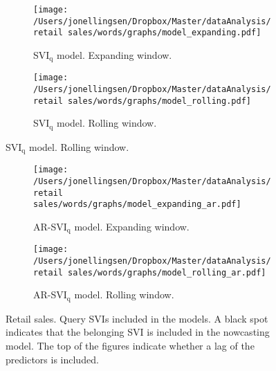\begin{figure}[ht]
    \centering
    \begin{subfigure}[b]{\textwidth}
\caption{SVI$_{\text{q}}$ model. Expanding window.}
        \texttt{[image: /Users/jonellingsen/Dropbox/Master/dataAnalysis/retail sales/words/graphs/model\_expanding.pdf]}
    \end{subfigure}
    \begin{subfigure}[b]{\textwidth}
\caption{SVI$_{\text{q}}$ model. Rolling window.}
        \texttt{[image: /Users/jonellingsen/Dropbox/Master/dataAnalysis/retail sales/words/graphs/model\_rolling.pdf]}
    \end{subfigure}
\end{figure}
\begin{figure}\ContinuedFloat
\begin{subfigure}[b]{\textwidth}
 \caption{AR-SVI$_{\text{q}}$ model. Expanding window.}        
\texttt{[image: /Users/jonellingsen/Dropbox/Master/dataAnalysis/retail sales/words/graphs/model\_expanding\_ar.pdf]}
    \end{subfigure}
\begin{subfigure}[b]{\textwidth}
\caption{AR-SVI$_{\text{q}}$ model. Rolling window.}        
\texttt{[image: /Users/jonellingsen/Dropbox/Master/dataAnalysis/retail sales/words/graphs/model\_rolling\_ar.pdf]}
    \end{subfigure}
\caption{Retail sales. Query SVIs included in the models. A black spot indicates that the belonging SVI is included in the nowcasting model. The top of the figures indicate whether a lag of the predictors is included.}
\label{model_queries_rsales}
\end{figure}

